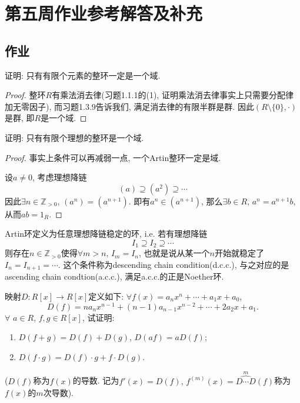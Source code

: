 \documentclass{../solutions-cn}
\begin{document}
\section*{第五周作业参考解答及补充}

\subsection*{作业}

\begin{exercise}[习题2.1.3]
    证明: 只有有限个元素的整环一定是一个域.
\end{exercise}

\begin{proof}
    整环$R$有乘法消去律(习题1.1.1的(1), 证明乘法消去律事实上只需要分配律加无零因子), 而习题1.3.9告诉我们, 满足消去律的有限半群是群. 因此$(R \setminus \{0\}, \cdot)$是群, 即$R$是一个域.
\end{proof}

\begin{exercise}[习题2.1.4]
    证明: 只有有限个理想的整环是一个域.
\end{exercise}

\begin{proof}
    事实上条件可以再减弱一点, 一个Artin整环一定是域.

    设$a \neq 0$, 考虑理想降链
    \[
        (a) \supseteq (a^2) \supseteq \cdots 
    \]
    因此$\exists n \in \mathbb{Z}_{>0},\, (a^n) = (a^{n + 1})$. 即有$a^n \in (a^{n + 1})$, 那么$\exists b \in R,\, a^n = a^{n + 1}b$, 从而$ab = 1_R$.
\end{proof}

\begin{remark}
    Artin环定义为任意理想降链稳定的环, i.e. 若有理想降链
    \[
        I_1 \supseteq I_2 \supseteq \cdots 
    \]
    则存在$n \in \mathbb{Z}_{>0}$使得$\forall m > n,\, I_m = I_n$, 也就是说从某一个$n$开始就稳定了$I_n = I_{n + 1} = \cdots$. 这个条件称为descending chain condition(d.c.c.), 与之对应的是ascending chain condtion(a.c.c.), 满足a.c.c.的正是Noether环.
\end{remark}

\begin{exercise}[习题2.1.9]
    映射$D:R[x] \longrightarrow R[x]$定义如下: $\forall f(x) = a_nx^n + \cdots + a_1x + a_0$,
    \[
        D(f) = na_nx^{n - 1} + (n - 1)a_{n - 1}x^{n - 2} + \cdots + 2a_2x + a_1.
    \]
    $\forall$ $a \in R$, $f, g \in R[x]$, 试证明: 
    \begin{enumerate}[(1)]
        \item $D(f + g) = D(f) + D(g)$, $D(af) = aD(f)$;
        \item $D(f \cdot g) = D(f) \cdot g + f \cdot D(g)$.
    \end{enumerate}
    ($D(f)$称为$f(x)$的导数. 记为$f'(x) = D(f),\, f^{(m)}(x) = \overset{m}{\widehat{D \cdots D}}(f)$称为$f(x)$的$m$次导数).
\end{exercise}
\end{document}
